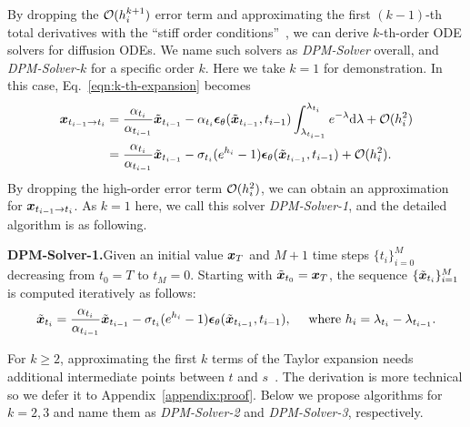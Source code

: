 By dropping the $\mathcal O(h_i^{k+1})$  error term and approximating the first $(k-1)$-th total derivatives with the ``stiff order conditions''~\citep{hochbruck2005explicit,luan2021efficient},
we can derive $k$-th-order ODE solvers for diffusion ODEs. We name such solvers as \textit{DPM-Solver} overall, and \textit{DPM-Solver-$k$} for a specific order $k$. %
Here we take $k=1$ for demonstration. In this case, Eq.~\eqref{eqn:k-th-expansion} becomes
\begin{align}
    \bm{x}_{t_{i-1} \to t_i} &= \frac{\alpha_{t_i}}{\alpha_{t_{i-1}}} \tilde{\bm{x}}_{t_{i-1}} - \alpha_{t_i} \bm{\epsilon}_\theta(\tilde{\bm{x}}_{t_{i-1}},t_{i-1}) \int_{\lambda_{t_{i-1}}}^{\lambda_{t_i}} e^{-\lambda}\dd\lambda + \mathcal O(h_i^2) \nonumber \\
    &= \frac{\alpha_{t_i}}{\alpha_{t_{i-1}}} \tilde{\bm{x}}_{t_{i-1}} - \sigma_{t_i} (e^{h_i} - 1)\bm{\epsilon}_\theta(\tilde{\bm{x}}_{t_{i-1}},t_{i-1}) + \mathcal O(h_i^2).   \nonumber
\end{align}
By dropping the high-order error term $\mathcal O(h_i^2)$, we can obtain an approximation for $\bm{x}_{t_{i-1} \to t_i} $. As $k=1$ here, we call this solver \textit{DPM-Solver-1}, and the detailed algorithm is as following.

\textbf{DPM-Solver-1.}\quad Given an initial value $\bm{x}_T$ and $M+1$ time steps $\{t_i\}_{i=0}^M$ decreasing from $t_0=T$ to $t_M=0$. Starting with $\tilde{\bm{x}}_{t_0}=\bm{x}_T$, the sequence $\{\tilde{\bm{x}}_{t_i}\}_{i=1}^M$ is computed iteratively as follows:
\begin{equation}
\label{eqn:1st}
    \tilde{\bm{x}}_{t_i} = \frac{\alpha_{t_i}}{\alpha_{t_{i-1}}} \tilde{\bm{x}}_{t_{i-1}} - \sigma_{t_i} (e^{h_i} - 1)\bm{\epsilon}_\theta(\tilde{\bm{x}}_{t_{i-1}},t_{i-1}),~~~~\mbox{where }h_i=\lambda_{t_i} - \lambda_{t_{i-1}}.
\end{equation}

For $k\geq 2$, approximating the first $k$ terms of the Taylor expansion needs additional intermediate points between $t$ and $s$~\citep{hochbruck2005explicit}.
The derivation is more technical so we defer it to Appendix~\ref{appendix:proof}.
Below we propose algorithms for $k=2,3$ and name them as \textit{DPM-Solver-2} and \textit{DPM-Solver-3}, respectively.










